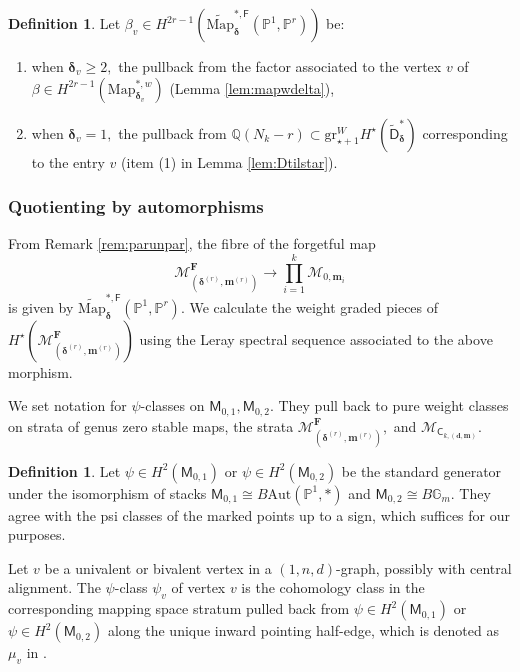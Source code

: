 \documentclass[12pt,reqno]{amsart}
\theoremstyle{definition}
\theoremstyle{definition}
\theoremstyle{definition}
\theoremstyle{definition}
\newtheorem{definition}[theorem]{Definition}
\begin{document}
\begin{definition}\label{defn:betav}
  Let $\beta_v\in H^{2r-1}(\widetilde{\mathrm{Map}}_{\boldsymbol{\delta}}^{*, \mathsf{F}}(\mathbb{P}^1, \mathbb{P}^r))$ be:\begin{enumerate}
    \item when $\boldsymbol{\delta}_v\geq 2,$ the pullback from the factor associated to the vertex $v$ of $\beta\in H^{2r-1}(\mathrm{Map}_{\boldsymbol{\delta}_v}^{*,w})$ (Lemma \ref{lem:mapwdelta}),
    \item when $\boldsymbol{\delta}_v = 1,$ the pullback from $\mathbb{Q}(N_k-r)\subset \mathrm{gr}^W_{\star+1}H^\star(\widetilde{\mathsf{D}}_{\boldsymbol{\delta}}^*)$ corresponding to the entry $v$ (item (1) in Lemma \ref{lem:Dtilstar}). 
  \end{enumerate}
   
\end{definition}

\subsubsection{Quotienting by automorphisms}\label{subsubsec:quotaut}
From Remark \ref{rem:parunpar}, the fibre of the forgetful map
$$\mathcal{M}^{\mathbf{F}}_{(\boldsymbol{\delta}^{(r)}, \boldsymbol{m}^{(r)})}\to \prod_{i=1}^k \mathcal{M}_{0, \boldsymbol{m}_i}$$ is given by $\widetilde{\mathrm{Map}}_{\boldsymbol{\delta}}^{*, \mathsf{F}}(\mathbb{P}^1, \mathbb{P}^r).$ We calculate the weight graded pieces of $H^\star(\mathcal{M}^{\mathbf{F}}_{(\boldsymbol{\delta}^{(r)}, \boldsymbol{m}^{(r)})})$ using the Leray spectral sequence associated to the above morphism. 

We set notation for $\psi$-classes on $\mathsf{M}_{0,1}, \mathsf{M}_{0,2}.$ They pull back to pure weight classes on strata of genus zero stable maps, the strata $\mathcal{M}^{\mathbf{F}}_{(\boldsymbol{\delta}^{(r)}, \boldsymbol{m}^{(r)})},$ and \(\mathcal{M}_{\mathsf{C}_{k, (\mathbf{d}, \mathbf{m})}}.\)

\begin{definition}
  Let $\psi\in H^2(\mathsf{M}_{0,1})$ or $\psi\in H^2(\mathsf{M}_{0,2})$ be the standard generator under the isomorphism of stacks $\mathsf{M}_{0,1}\cong B \mathrm{Aut}(\mathbb{P}^1, *)$ and $\mathsf{M}_{0,2}\cong {B}\mathbb{G}_m.$ They agree with the psi classes of the marked points up to a sign, which suffices for our purposes.
  
  Let $v$ be a univalent or bivalent vertex in a $(1,n,d)$-graph, possibly with central alignment. The $\psi$-class $\psi_v$ of vertex $v$ is the cohomology class in the corresponding mapping space stratum pulled back from $\psi\in H^2(\mathsf{M}_{0,1})$ or $\psi\in H^2(\mathsf{M}_{0,2})$ along the unique inward pointing half-edge, which is denoted as $\mu_v$ in \cite{vzdualcomplex}. 
\end{definition}
\end{document}
